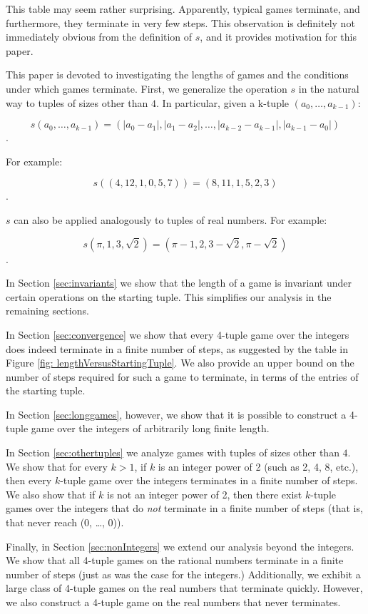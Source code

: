 \documentclass[12pt]{amsart}
\newcommand{\diff}{s}
\begin{document}
This table may seem rather surprising. Apparently, typical games terminate, and furthermore, they terminate in very few steps. This observation is definitely not immediately obvious from the definition of $\diff$, and it provides motivation for this paper.

This paper is devoted to investigating the lengths of games and the conditions under which games terminate. First, we generalize the operation $\diff$ in the natural way to tuples of sizes other than $4$. In particular, given a k-tuple $(a_0, \ldots, a_{k-1})$:

$$\diff(a_0, \ldots, a_{k-1}) = (|a_0 - a_1|, |a_1 - a_2|, \ldots, |a_{k-2} - a_{k-1}|, |a_{k-1} - a_0|)$$.

For example:

$$\diff((4, 12, 1, 0, 5, 7)) = (8, 11, 1, 5, 2, 3)$$.

$\diff$ can also be applied analogously to tuples of real numbers. For example:

$$\diff(\pi, 1, 3, \sqrt{2}) = (\pi - 1, 2, 3 - \sqrt{2}, \pi - \sqrt{2})$$.

In Section \ref{sec:invariants} we show that the length of a game is invariant under certain operations on the starting tuple. This simplifies our analysis in the remaining sections.

In Section \ref{sec:convergence} we show that every 4-tuple game over the integers does indeed terminate in a finite number of steps, as suggested by the table in Figure \ref{fig: lengthVersusStartingTuple}. We also provide an upper bound on the number of steps required for such a game to terminate, in terms of the entries of the starting tuple.

In Section \ref{sec:longgames}, however, we show that it is possible to construct a 4-tuple game over the integers of arbitrarily long finite length. 

In Section \ref{sec:othertuples} we analyze games with tuples of sizes other than $4$. We show that for every $k > 1$, if $k$ is an integer power of 2 (such as 2, 4, 8, etc.), then every $k$-tuple game over the integers terminates in a finite number of steps. We also show that if $k$ is not an integer power of 2, then there exist $k$-tuple games over the integers that do \textit{not} terminate in a finite number of steps (that is, that never reach (0, \ldots, 0)).

Finally, in Section \ref{sec:nonIntegers} we extend our analysis beyond the integers. We show that all 4-tuple games on the rational numbers terminate in a finite number of steps (just as was the case for the integers.) Additionally, we exhibit a large class of 4-tuple games on the real numbers that terminate quickly. However, we also construct a 4-tuple game on the real numbers that never terminates.
\end{document}
